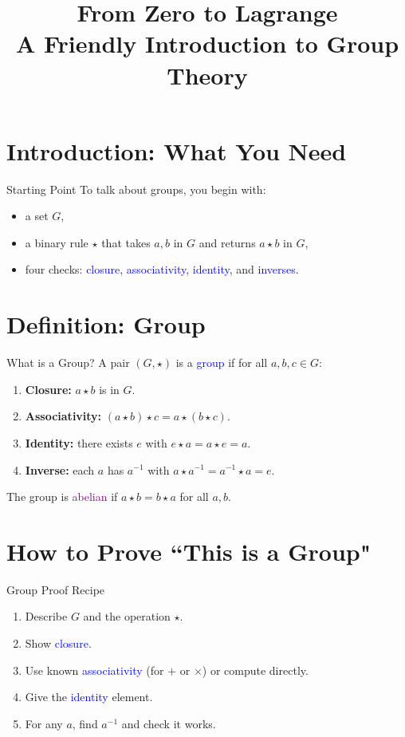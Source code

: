 \documentclass[12pt]{article}
\title{From Zero to Lagrange\\\small A Friendly Introduction to Group Theory}
\author{}
\date{}
\begin{document}
\maketitle

\section*{Introduction: What You Need}
\begin{definitionbox}{Starting Point}
To talk about groups, you begin with:
\begin{itemize}
  \item a set $G$,
  \item a binary rule $\star$ that takes $a,b$ in $G$ and returns $a\star b$ in $G$,
  \item four checks: \textcolor{blue}{closure}, \textcolor{blue}{associativity}, \textcolor{blue}{identity}, and \textcolor{blue}{inverses}.
\end{itemize}
\end{definitionbox}

\section*{Definition: Group}
\begin{definitionbox}{What is a Group?}
A pair $(G,\star)$ is a \textcolor{blue}{group} if for all $a,b,c\in G$:
\begin{enumerate}
  \item \textbf{Closure:} $a\star b$ is in $G$.
  \item \textbf{Associativity:} $(a\star b)\star c = a\star(b\star c)$.
  \item \textbf{Identity:} there exists $e$ with $e\star a = a\star e = a$.
  \item \textbf{Inverse:} each $a$ has $a^{-1}$ with $a\star a^{-1} = a^{-1}\star a = e$.
\end{enumerate}
The group is \textcolor{purple}{abelian} if $a\star b = b\star a$ for all $a,b$.
\end{definitionbox}

\section*{How to Prove ``This is a Group"}
\begin{examplebox}{Group Proof Recipe}
\begin{enumerate}
  \item Describe $G$ and the operation $\star$.
  \item Show \textcolor{blue}{closure}.
  \item Use known \textcolor{blue}{associativity} (for $+$ or $\times$) or compute directly.
  \item Give the \textcolor{blue}{identity} element.
  \item For any $a$, find $a^{-1}$ and check it works.
\end{enumerate}
\end{examplebox}
\end{document}
